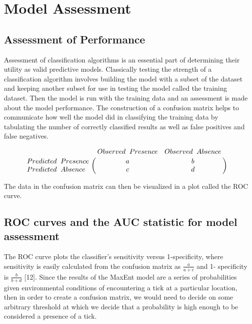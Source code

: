 

\section{Model Assessment }  %

\subsection{Assessment of Performance }

Assessment of classification algorithms is an essential part of determining their utility as valid predictive models. Classically testing the strength of a classification algorithm involves building the model with a subset of the dataset and keeping another subset for use in testing the model called the training dataset. Then the model is run with the training data and an assessment is made about the model performance. The construction of a confusion matrix helps to communicate how well the model did in classifying the training data by tabulating the number of correctly classified results as well as false positives and false negatives. 

\begin{equation} \bordermatrix{~ & Observed \hspace{0.2cm} Presence & Observed \hspace{0.2cm} Absence \cr
                  Predicted\hspace{0.2cm}  Presence & a & b \cr
                  Predicted \hspace{0.2cm} Absence & c & d \cr} \end{equation}
                  
\noindent The data in the confusion matrix can then be visualized in a plot called the ROC curve. \newline

\subsection{ROC curves and the AUC statistic for model assessment }

The ROC curve plots the classifier's sensitivity versus 1-specificity, where sensitivity is easily calculated from the confusion matrix as  $\frac{a}{a+c}$ and 1- specificity is $\frac{b}{b+d}$ [12]. Since the results of the MaxEnt model are a series of probabilities given environmental conditions of encountering a tick at a particular location, then in order to create a confusion matrix, we would need to decide on some arbitrary threshold at which we decide that a probability is high enough to be considered a presence of a tick. \newline

